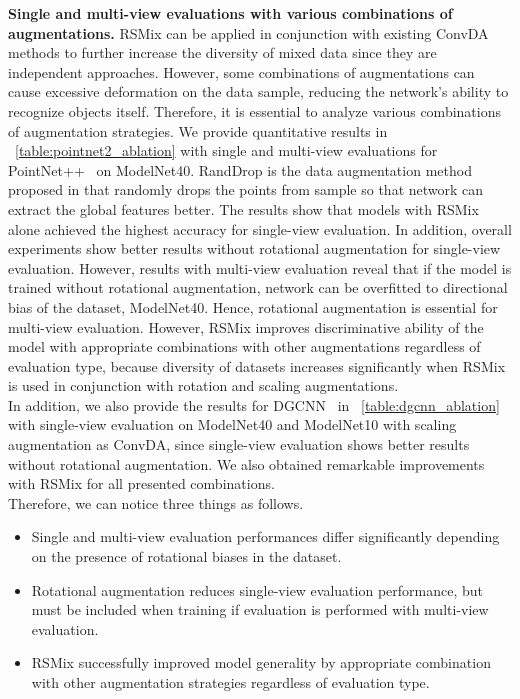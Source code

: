\documentclass[final]{cvpr}
\begin{document}
\noindent \textbf{Single and multi-view evaluations with various combinations of augmentations.} RSMix can be applied in conjunction with existing ConvDA methods to further increase the diversity of mixed data since they are independent approaches. However, some combinations of augmentations can cause excessive deformation on the data sample, reducing the network's ability to recognize objects itself. Therefore, it is essential to analyze various combinations of augmentation strategies. We provide quantitative results in \tablename~\ref{table:pointnet2_ablation} with single and multi-view evaluations for PointNet++~\cite{qi2017pointnet++} on ModelNet40. RandDrop is the data augmentation method proposed in \cite{qi2017pointnet++} that randomly drops the points from sample so that network can extract the global features better. The results show that models with RSMix alone achieved the highest accuracy for single-view evaluation. In addition, overall experiments show better results without rotational augmentation for single-view evaluation. However, results with multi-view evaluation reveal that if the model is trained without rotational augmentation, network can be overfitted to directional bias of the dataset, ModelNet40. Hence, rotational augmentation is essential for multi-view evaluation. However, RSMix improves discriminative ability of the model with appropriate combinations with other augmentations regardless of evaluation type, because diversity of datasets increases significantly when RSMix is used in conjunction with rotation and scaling augmentations. \\
\indent In addition, we also provide the results for DGCNN~\cite{wang2019dynamic} in \tablename~\ref{table:dgcnn_ablation} with single-view evaluation on ModelNet40 and ModelNet10 with scaling augmentation as ConvDA, since single-view evaluation shows better results without rotational augmentation. We also obtained remarkable improvements with RSMix for all presented combinations.\\
\indent Therefore, we can notice three things as follows.
\begin{itemize}
	\item Single and multi-view evaluation performances differ significantly depending on the presence of rotational biases in the dataset.
\item Rotational augmentation reduces single-view evaluation performance, but must be included when training if evaluation is performed with multi-view evaluation.
\item RSMix successfully improved model generality by appropriate combination with other augmentation strategies regardless of evaluation type.
\end{itemize}
\end{document}
